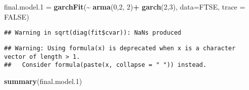 \documentclass[
]{article}
\newenvironment{Shaded}{\begin{snugshade}}{\end{snugshade}}
\newcommand{\DataTypeTok}[1]{\textcolor[rgb]{0.13,0.29,0.53}{#1}}
\newcommand{\DecValTok}[1]{\textcolor[rgb]{0.00,0.00,0.81}{#1}}
\newcommand{\FloatTok}[1]{\textcolor[rgb]{0.00,0.00,0.81}{#1}}
\newcommand{\KeywordTok}[1]{\textcolor[rgb]{0.13,0.29,0.53}{\textbf{#1}}}
\newcommand{\NormalTok}[1]{#1}
\newcommand{\OperatorTok}[1]{\textcolor[rgb]{0.81,0.36,0.00}{\textbf{#1}}}
\newcommand{\OtherTok}[1]{\textcolor[rgb]{0.56,0.35,0.01}{#1}}
\newcommand{\StringTok}[1]{\textcolor[rgb]{0.31,0.60,0.02}{#1}}
\begin{document}
\begin{Shaded}
\begin{Highlighting}[]
\NormalTok{final.model}\FloatTok{.1}\NormalTok{ =}\StringTok{ }\KeywordTok{garchFit}\NormalTok{(}\OperatorTok{\textasciitilde{}}\StringTok{ }\KeywordTok{arma}\NormalTok{(}\DecValTok{0}\NormalTok{,}\DecValTok{2}\NormalTok{, }\DecValTok{2}\NormalTok{)}\OperatorTok{+}\StringTok{ }\KeywordTok{garch}\NormalTok{(}\DecValTok{2}\NormalTok{,}\DecValTok{3}\NormalTok{), }\DataTypeTok{data=}\NormalTok{FTSE, }\DataTypeTok{trace =} \OtherTok{FALSE}\NormalTok{)}
\end{Highlighting}
\end{Shaded}

\begin{verbatim}
## Warning in sqrt(diag(fit$cvar)): NaNs produced
\end{verbatim}

\begin{verbatim}
## Warning: Using formula(x) is deprecated when x is a character vector of length > 1.
##   Consider formula(paste(x, collapse = " ")) instead.
\end{verbatim}

\begin{Shaded}
\begin{Highlighting}[]
\KeywordTok{summary}\NormalTok{(final.model}\FloatTok{.1}\NormalTok{)}
\end{Highlighting}
\end{Shaded}
\end{document}
